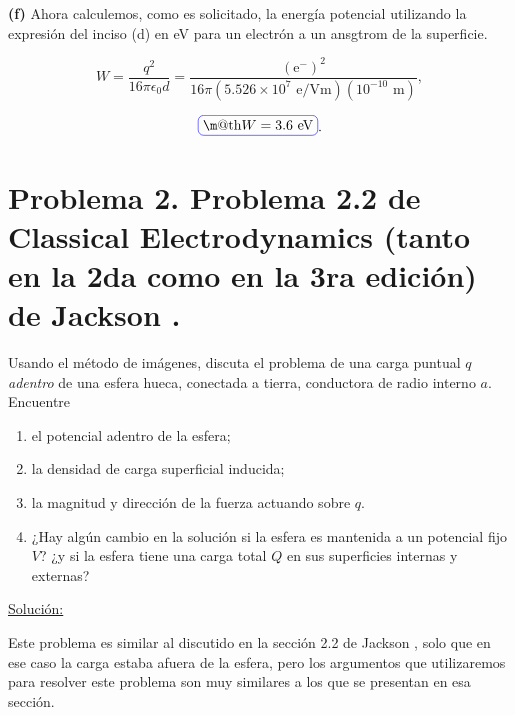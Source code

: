 \documentclass[a4paper,11pt]{article}
\makeatletter
\numberwithin{equation}{section}
\newcommand*{\boxcolor}{blue}
\renewcommand{\boxed}[1]{\textcolor{\boxcolor}{%
\tikz[baseline={([yshift=-1ex]current bounding box.center)}] \node [rectangle, minimum width=1ex,rounded corners,draw] {\normalcolor\m@th$\displaystyle#1$};}}
\makeatother
\begin{document}
\vspace{.3cm}

\textbf{(f)} Ahora calculemos, como es solicitado, la energía potencial utilizando 
la expresión del inciso (d) en eV para un electrón a un ansgtrom de la superficie.

\begin{equation}
 W = \frac{q^2}{16\pi\epsilon_0d} = \frac{(\text{e}^-)^2}{16\pi(5.526\times 10^7 \text{ e/Vm})
 (10^{-10}\text{ m})},
\end{equation}

\begin{equation}
 \boxed{W = 3.6 \text{ eV}}.
\end{equation}

\newpage

\section{Problema 2. Problema 2.2 de Classical Electrodynamics (tanto en la 2da 
como en la 3ra edición) de Jackson \cite{jackson2,jackson3}.}

Usando el método de imágenes, discuta el problema de una carga puntual $q$ 
\emph{adentro} de una esfera hueca, conectada a tierra, conductora de radio interno
$a$. Encuentre 

\begin{enumerate}[label=\textbf{(\alph*)}]
 \item el potencial adentro de la esfera;
 \item la densidad de carga superficial inducida;
 \item la magnitud y dirección de la fuerza actuando sobre $q$.
 \item ¿Hay algún cambio en la solución si la esfera es mantenida a un potencial 
 fijo $V$? ¿y si la esfera tiene una carga total $Q$ en sus superficies internas y 
 externas?
\end{enumerate}

\vspace{.3cm}

\underline{Solución:} \vspace{.3cm}

Este problema es similar al discutido en la sección 2.2 de Jackson \cite{jackson3}, 
solo que en ese caso la carga estaba afuera de la esfera, pero los argumentos que 
utilizaremos para resolver este problema son muy similares a los que se presentan 
en esa sección. 

\vspace{.3cm}
\end{document}
